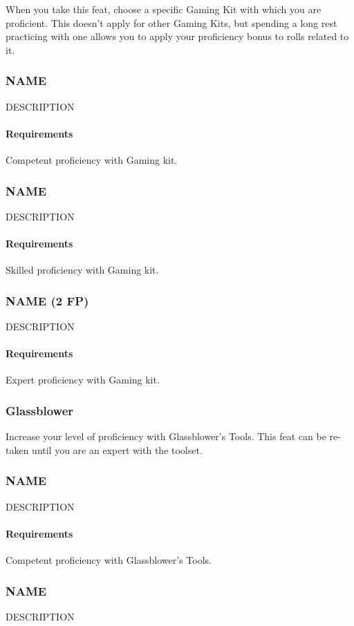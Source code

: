    When you take this feat, choose a specific Gaming Kit with which you are proficient.
    This doesn't apply for other Gaming Kits, but spending a long rest practicing with one allows you to apply your proficiency bonus to rolls related to it.
\subsubsection{NAME} \label{feat::name}
    DESCRIPTION
    \paragraph{Requirements} Competent proficiency with Gaming kit.
\subsubsection{NAME} \label{feat::name}
    DESCRIPTION
    \paragraph{Requirements} Skilled proficiency with Gaming kit.
\subsubsection{NAME (2 FP)} \label{feat::name}
    DESCRIPTION
    \paragraph{Requirements} Expert proficiency with Gaming kit.
\subsubsection{Glassblower} \label{feat::glassblower}
    Increase your level of proficiency with Glassblower's Tools.
    This feat can be re-taken until you are an expert with the toolset.
\subsubsection{NAME} \label{feat::name}
    DESCRIPTION
    \paragraph{Requirements} Competent proficiency with Glassblower's Tools.
\subsubsection{NAME} \label{feat::name}
    DESCRIPTION %
